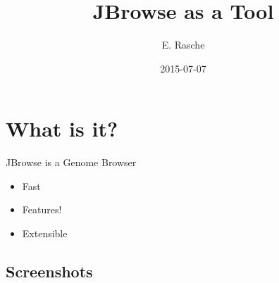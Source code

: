 \documentclass[12pt]{beamer} %
\title[JBrowse as a Tool]{JBrowse as a Tool}
\author[E. Rasche]{E. Rasche}
\date{2015-07-07}
\begin{document}
\frame{\titlepage}

\section{What is it?}
\begin{frame}{JBrowse is a Genome Browser}
	\begin{itemize}
    	\item Fast
        \item Features! 
        \item Extensible
    \end{itemize}
\end{frame}

\subsection{Screenshots}



{
  \begin{frame}[plain]
  \end{frame}
}

{
  \begin{frame}[plain]
  \end{frame}
}
\end{document}
